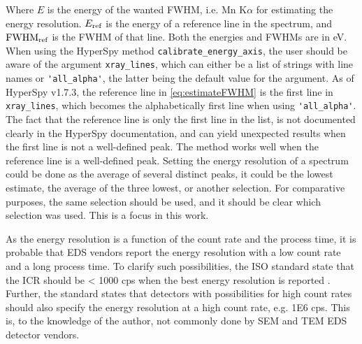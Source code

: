 Where $E$ is the energy of the wanted FWHM, i.e. Mn K$\alpha$ for estimating the energy resolution.
$E_\textnormal{ref}$ is the energy of a reference line in the spectrum, and $\textnormal{FWHM}_{\textnormal{ref}}$ is the FWHM of that line.
Both the energies and FWHMs are in eV.
When using the HyperSpy method \verb|calibrate_energy_axis|, the user should be aware of the argument \verb|xray_lines|, which can either be a list of strings with line names or \verb|'all_alpha'|, the latter being the default value for the argument.
As of HyperSpy v1.7.3, the reference line in \cref{eq:estimateFWHM} is the first line in \verb|xray_lines|, which becomes the alphabetically first line when using \verb|'all_alpha'|.
The fact that the reference line is only the first line in the list, is not documented clearly in the HyperSpy documentation, and can yield unexpected results when the first line is not a well-defined peak.
The method works well when the reference line is a well-defined peak.
Setting the energy resolution of a spectrum could be done as the average of several distinct peaks, it could be the lowest estimate, the average of the three lowest, or another selection.
For comparative purposes, the same selection should be used, and it should be clear which selection was used.
This is a focus in this work.





As the energy resolution is a function of the count rate and the process time, it is probable that EDS vendors report the energy resolution with a low count rate and a long process time.
To clarify such possibilities, the ISO standard state that the ICR should be < 1000 cps when the best energy resolution is reported \cite{iso_qc_15632}.
Further, the standard states that detectors with possibilities for high count rates should also specify the energy resolution at a high count rate, e.g. 1E6 cps.
This is, to the knowledge of the author, not commonly done by SEM and TEM EDS detector vendors.

